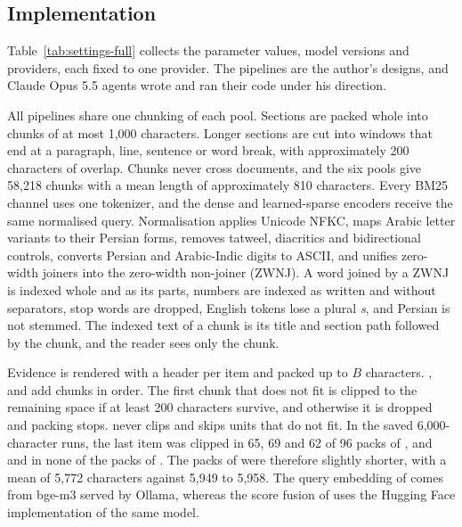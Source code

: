 \subsection{Implementation}
\label{app:implementation}
Table~\ref{tab:settings-full} collects the parameter values, model versions and providers, each fixed to one provider.
The pipelines are the author's designs, and Claude Opus 5.5 agents wrote and ran their code under his direction.


All pipelines share one chunking of each pool.
Sections are packed whole into chunks of at most 1,000 characters.
Longer sections are cut into windows that end at a paragraph, line, sentence or word break, with approximately 200 characters of overlap.
Chunks never cross documents, and the six pools give 58,218 chunks with a mean length of approximately 810 characters.
Every BM25 channel uses one tokenizer, and the dense and learned-sparse encoders receive the same normalised query.
Normalisation applies Unicode NFKC, maps Arabic letter variants to their Persian forms, removes tatweel, diacritics and bidirectional controls, converts Persian and Arabic-Indic digits to ASCII, and unifies zero-width joiners into the zero-width non-joiner (ZWNJ).
A word joined by a ZWNJ is indexed whole and as its parts, numbers are indexed as written and without separators, stop words are dropped, English tokens lose a plural \emph{s}, and Persian is not stemmed.
The indexed text of a chunk is its title and section path followed by the chunk, and the reader sees only the chunk.

Evidence is rendered with a header per item and packed up to $B$ characters.
\hybrid{}, \hr{} and \setr{} add chunks in order.
The first chunk that does not fit is clipped to the remaining space if at least 200 characters survive, and otherwise it is dropped and packing stops.
\lexb{} never clips and skips units that do not fit.
In the saved 6,000-character runs, the last item was clipped in 65, 69 and 62 of 96 packs of \hybrid{}, \hr{} and \setr{} and in none of the packs of \lexb{}.
The packs of \lexb{} were therefore slightly shorter, with a mean of 5,772 characters against 5,949 to 5,958.
The query embedding of \hybrid{} comes from bge-m3 served by Ollama, whereas the score fusion of \lexb{} uses the Hugging Face implementation of the same model.

